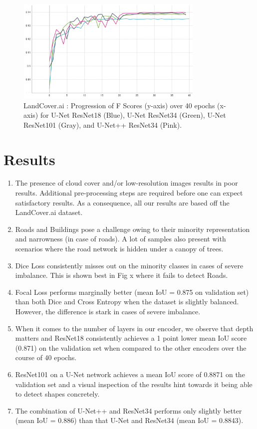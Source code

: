 \documentclass[conference]{IEEEtran}
\begin{document}
\begin{figure}[!h]
    \includegraphics[width=9cm, height=5cm]{images/encoders/encoders_fscore.png}
    \caption{LandCover.ai : Progression of F Scores (y-axis) over 40 epochs (x-axis) for U-Net ResNet18 (Blue), U-Net ResNet34 (Green), U-Net ResNet101 (Gray), and U-Net++ ResNet34 (Pink). }
\end{figure}


\section{Results}

\begin{enumerate}
    \item The presence of cloud cover and/or low-resolution images results in poor results. Additional pre-processing steps are required before one can expect satisfactory results. As a consequence, all our results are based off the LandCover.ai dataset.
    \item Roads and Buildings pose a challenge owing to their minority representation and narrowness (in case of roads). A lot of samples also present with scenarios where the road network is hidden under a canopy of trees.
    \item Dice Loss consistently misses out on the minority classes in cases of severe imbalance. This is shown best in Fig x where it fails to detect Roads.
    \item Focal Loss performs marginally better (mean IoU = 0.875 on validation set) than both Dice and Cross Entropy when the dataset is slightly balanced. However, the difference is stark in cases of severe imbalance.
    \item When it comes to the number of layers in our encoder, we observe that depth matters and ResNet18 consistently achieves a 1 point lower mean IoU score (0.871) on the validation set when compared to the other encoders over the course of 40 epochs.
    \item ResNet101 on a U-Net network achieves a mean IoU score of 0.8871 on the validation set and a visual inspection of the results hint towards it being able to detect shapes concretely.
    \item The combination of U-Net++ and ResNet34 performs only slightly better (mean IoU = 0.886) than that U-Net and ResNet34 (mean IoU = 0.8843).
\end{enumerate}
\end{document}
